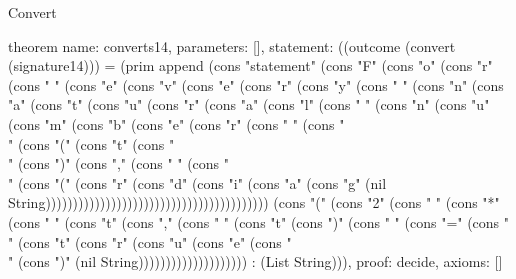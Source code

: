 \begin{lexlean}{Convert}
\begin{semanticmodule}
theorem{
  name: converts14,
  parameters: [],
  statement: ((outcome (convert (signature14))) = (prim append (cons "statement" (cons "F" (cons "o" (cons "r" (cons " " (cons "e" (cons "v" (cons "e" (cons "r" (cons "y" (cons " " (cons "n" (cons "a" (cons "t" (cons "u" (cons "r" (cons "a" (cons "l" (cons " " (cons "n" (cons "u" (cons "m" (cons "b" (cons "e" (cons "r" (cons " " (cons "\\" (cons "(" (cons "t" (cons "\\" (cons ")" (cons "," (cons " " (cons "\\" (cons "(" (cons "r" (cons "d" (cons "i" (cons "a" (cons "g" (nil String))))))))))))))))))))))))))))))))))))))))) (cons "(" (cons "2" (cons " " (cons "*" (cons " " (cons "t" (cons "," (cons " " (cons "t" (cons ")" (cons " " (cons "=" (cons " " (cons "t" (cons "r" (cons "u" (cons "e" (cons "\\" (cons ")" (nil String)))))))))))))))))))) : (List String))),
  proof: decide{},
  axioms: []
}


\end{semanticmodule}
\end{lexlean}
